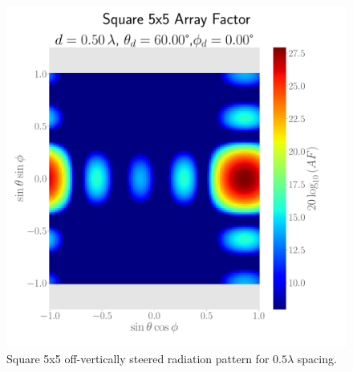\begin{figure}[H]
\begin{minipage}[t]{0.45\textwidth}
    \includegraphics[width=\textwidth]{graphics/task_1/square-0.50-lambda-60.00-theta-0.00-phi-radpat.pdf}
    \caption{Square 5x5 off-vertically steered radiation pattern for $0.5\lambda$ spacing.}\label{fig:rad-square-0.5-60}
   \end{minipage}
\end{figure}

